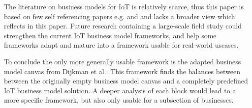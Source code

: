 	The literature on business models for IoT is relatively scarce, thus this paper is based on few self referencing papers e.g. \cite{ju} and \cite{dijkman} and lacks a broader view which reflects in this paper. Future research containing a large-scale field study could strengthen the current IoT business model frameworks, and help some frameworks adapt and mature into a framework usable for real-world uscases.

	To conclude the only more generally usable framework is the adapted business model canvas from Dijkman et al.. This framework finds the balances between between the originally empty business model canvas and a completely predefined IoT business model solution. A deeper analysis of each block would lead to a more specific framework, but also only usable for a subsection of businesses.

